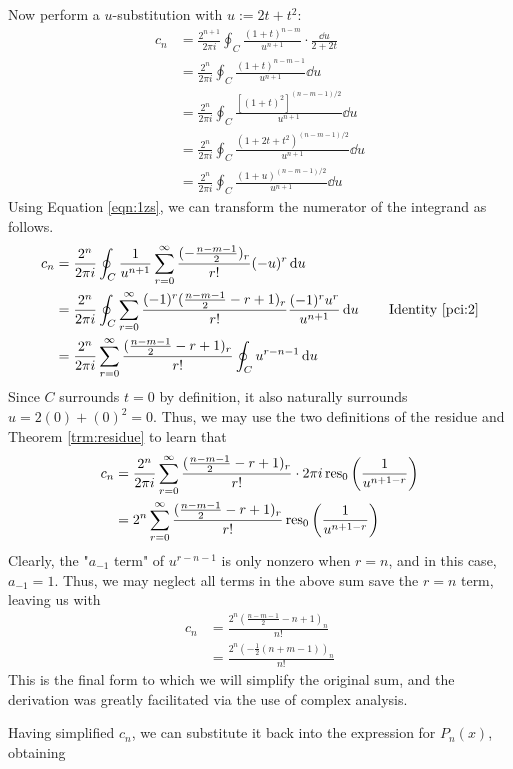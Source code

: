 \documentclass[titlepage]{article}
\numberwithin{equation}{section}
\begin{document}
Now perform a $u$-substitution with $u:=2t+t^2$:
\begin{align*}
    c_n &= \frac{2^{n+1}}{2\pi i}\oint_C\frac{(1+t)^{n-m}}{u^{n+1}}\cdot\frac{\dd{u}}{2+2t}\\
    &= \frac{2^n}{2\pi i}\oint_C\frac{(1+t)^{n-m-1}}{u^{n+1}}\dd{u}\\
    &= \frac{2^n}{2\pi i}\oint_C\frac{[(1+t)^2]^{(n-m-1)/2}}{u^{n+1}}\dd{u}\\
    &= \frac{2^n}{2\pi i}\oint_C\frac{(1+2t+t^2)^{(n-m-1)/2}}{u^{n+1}}\dd{u}\\
    &= \frac{2^n}{2\pi i}\oint_C\frac{(1+u)^{(n-m-1)/2}}{u^{n+1}}\dd{u}
\end{align*}
Using Equation \ref{eqn:1zs}, we can transform the numerator of the integrand as follows.
\begin{align*}
    c_n &= \frac{2^n}{2\pi i}\oint_C\frac{1}{u^{n+1}}\sum_{r=0}^\infty\frac{(-\tfrac{n-m-1}{2})_r}{r!}(-u)^r\dd{u}\\
    &= \frac{2^n}{2\pi i}\oint_C\sum_{r=0}^\infty\frac{(-1)^r(\tfrac{n-m-1}{2}-r+1)_r}{r!}\frac{(-1)^ru^r}{u^{n+1}}\dd{u}\tag*{Identity \ref{pci:2}}\\
    &= \frac{2^n}{2\pi i}\sum_{r=0}^\infty\frac{(\tfrac{n-m-1}{2}-r+1)_r}{r!}\oint_Cu^{r-n-1}\dd{u}
\end{align*}
Since $C$ surrounds $t=0$ by definition, it also naturally surrounds $u=2(0)+(0)^2=0$. Thus, we may use the two definitions of the residue and Theorem \ref{trm:residue} to learn that
\begin{align*}
    c_n &= \frac{2^n}{2\pi i}\sum_{r=0}^\infty\frac{(\tfrac{n-m-1}{2}-r+1)_r}{r!}\cdot 2\pi i\operatorname{res}_0\left( \frac{1}{u^{n+1-r}} \right)\\
    &= 2^n\sum_{r=0}^\infty\frac{(\tfrac{n-m-1}{2}-r+1)_r}{r!}\operatorname{res}_0\left( \frac{1}{u^{n+1-r}} \right)
\end{align*}
Clearly, the "$a_{-1}$ term" of $u^{r-n-1}$ is only nonzero when $r=n$, and in this case, $a_{-1}=1$. Thus, we may neglect all terms in the above sum save the $r=n$ term, leaving us with
\begin{align*}
    c_n &= \frac{2^n(\tfrac{n-m-1}{2}-n+1)_n}{n!}\\
    &= \frac{2^n\left( -\tfrac{1}{2}(n+m-1) \right)_n}{n!}
\end{align*}
This is the final form to which we will simplify the original sum, and the derivation was greatly facilitated via the use of complex analysis.\par
Having simplified $c_n$, we can substitute it back into the expression for $P_n(x)$, obtaining
\end{document}
